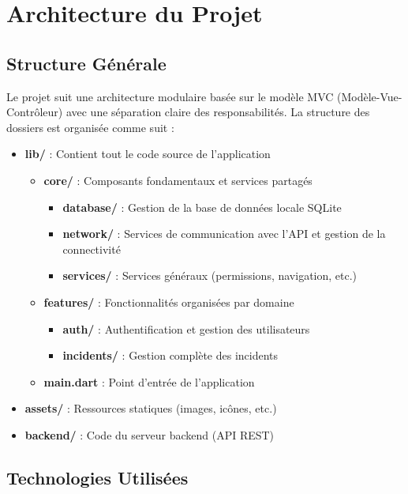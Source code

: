 \documentclass[12pt,a4paper]{article}
\begin{document}
\section{Architecture du Projet}

\subsection{Structure Générale}

Le projet suit une architecture modulaire basée sur le modèle MVC (Modèle-Vue-Contrôleur) avec une séparation claire des responsabilités. La structure des dossiers est organisée comme suit :

\begin{itemize}
    \item \textbf{lib/} : Contient tout le code source de l'application
    \begin{itemize}
        \item \textbf{core/} : Composants fondamentaux et services partagés
        \begin{itemize}
            \item \textbf{database/} : Gestion de la base de données locale SQLite
            \item \textbf{network/} : Services de communication avec l'API et gestion de la connectivité
            \item \textbf{services/} : Services généraux (permissions, navigation, etc.)
        \end{itemize}
        \item \textbf{features/} : Fonctionnalités organisées par domaine
        \begin{itemize}
            \item \textbf{auth/} : Authentification et gestion des utilisateurs
            \item \textbf{incidents/} : Gestion complète des incidents
        \end{itemize}
        \item \textbf{main.dart} : Point d'entrée de l'application
    \end{itemize}
    \item \textbf{assets/} : Ressources statiques (images, icônes, etc.)
    \item \textbf{backend/} : Code du serveur backend (API REST)
\end{itemize}

\subsection{Technologies Utilisées}
\end{document}
